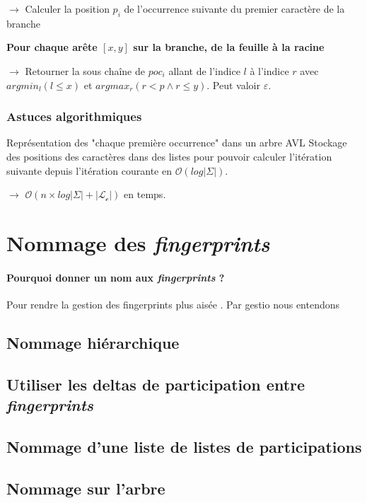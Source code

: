 \documentclass[a4paper]{article}
\begin{document}
$\rightarrow$ Calculer la position $p_i$ de l'occurrence suivante du premier caractère de la branche

\textbf{Pour chaque arête $[x,y]$ sur la branche, de la feuille à la racine}

$\rightarrow$ Retourner la sous chaîne de $poc_i$ allant de l'indice $l$ à l'indice $r$ avec $argmin_l(l \leq x)$ et $argmax_r(r < p \land r \leq y)$. Peut valoir $\varepsilon$.

\subsubsection{Astuces algorithmiques}

Représentation des "chaque première occurrence" dans un arbre AVL
Stockage des positions des caractères dans des listes pour pouvoir calculer l'itération suivante depuis l'itération courante en $\mathcal{O}(log |\Sigma|)$. \newline

$\rightarrow$ $\mathcal{O}(n \times log |\Sigma| + |\mathcal{L}_\mathcal{c}|)$ en temps.

\section{Nommage des \emph{fingerprints}}

\paragraph{Pourquoi donner un nom aux \emph{fingerprints} ?} Pour
rendre la gestion des fingerprints plus aisée \cite{amir, karp}. Par gestio nous entendons

\subsection{Nommage hiérarchique}

\subsection{Utiliser les deltas de participation entre \emph{fingerprints}}

\subsection{Nommage d'une liste de listes de participations}

\subsection{Nommage sur l'arbre}
\end{document}

